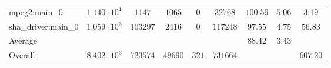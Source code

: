 \begin{tabular}{|l|c|c|c|c|c|c|c|c|}
mpeg2:main\_0           & $ 1.140 \cdot 10^{1} $ & $ 1147   $ & $ 1065  $ & $ 0   $ & $ 32768  $ & $ 100.59      $ & $ 5.06    $ & $ 3.19    $ \\
sha\_driver:main\_0     & $ 1.059 \cdot 10^{3} $ & $ 103297 $ & $ 2416  $ & $ 0   $ & $ 117248 $ & $ 97.55       $ & $ 4.75    $ & $ 56.83   $ \\
\hline
Average                 & $                    $ & $        $ & $       $ & $     $ & $        $ & $ 88.42       $ & $ 3.43    $ & $         $ \\
\hline
Overall                 & $ 8.402 \cdot 10^{3} $ & $ 723574 $ & $ 49690 $ & $ 321 $ & $ 731664 $ & $             $ & $         $ & $ 607.20  $ \\
\hline
\end{tabular}
